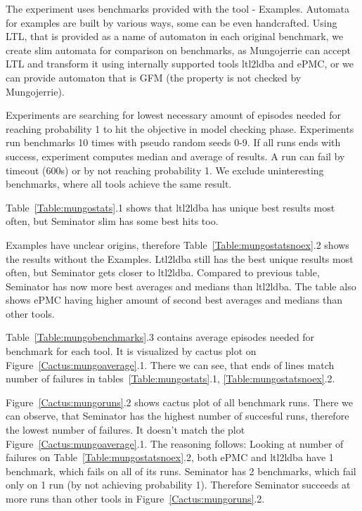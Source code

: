 \documentclass[
	digital,
nolof, nolot
]{fithesis3}
\begin{document}
	
	The experiment uses benchmarks provided with the tool - Examples. Automata for examples are built by various ways, some can be even handcrafted. Using LTL, that is provided as a name of automaton in each original benchmark, we create slim automata for comparison on benchmarks, as Mungojerrie can accept LTL and transform it using internally supported tools ltl2ldba and ePMC, or we can provide automaton that is GFM (the property is not checked by Mungojerrie).
	
	
	Experiments are searching for lowest necessary amount of episodes needed for reaching probability 1 to hit the objective in model checking phase. Experiments run benchmarks 10 times with pseudo random seeds 0-9. If all runs ends with success, experiment computes median and average of results. A run can fail by timeout (600s) or by not reaching probability 1. We exclude uninteresting benchmarks, where all tools achieve the same result. 
	
	Table~\ref{Table:mungostats}.1 shows that ltl2ldba has unique best results most often, but Seminator slim has some best hits too.
	
	Examples have unclear origins, therefore Table~\ref{Table:mungostatsnoex}.2 shows the results without the Examples. Ltl2ldba still has the best unique results most often, but Seminator gets closer to ltl2ldba. Compared to previous table, Seminator has now more best averages and medians than ltl2ldba. The table also shows ePMC having higher amount of second best averages and medians than other tools. 
	
	Table~\ref{Table:mungobenchmarks}.3 contains average episodes needed for benchmark for each tool. It is visualized by cactus plot on Figure~\ref{Cactus:mungoaverage}.1. There we can see, that ends of lines match number of failures in tables~\ref{Table:mungostats}.1, \ref{Table:mungostatsnoex}.2.
	
	Figure~\ref{Cactus:mungoruns}.2 shows cactus plot of all benchmark runs. There we can observe, that Seminator has the highest number of succesful runs, therefore the lowest number of failures. It doesn't match the plot Figure~\ref{Cactus:mungoaverage}.1. The reasoning follows: Looking at number of failures on Table~\ref{Table:mungostatsnoex}.2, both ePMC and ltl2ldba have 1 benchmark, which fails on all of its runs. Seminator has 2 benchmarks, which fail only on 1 run (by not achieving probability 1). Therefore Seminator succeeds at more runs than other tools in Figure~\ref{Cactus:mungoruns}.2.
	
	
	
\end{document}
